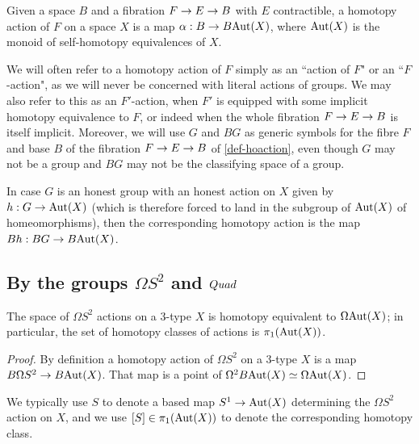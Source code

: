 \documentclass{amsart}
\begin{document}
\begin{definition} 
\label{def-hoaction}
Given a space $B$ and a fibration $F \rightarrow E \rightarrow B$ with $E$ contractible, a homotopy action of $F$ on a space $X$ is a map $\alpha: B \rightarrow B\mathrm{Aut}(X)$, where $\mathrm{Aut}(X)$ is the monoid of self-homotopy equivalences of $X$.
\end{definition}
\nid We will often refer to a homotopy action of $F$ simply as an ``action of $F$" or an ``$F$-action", as we will never be concerned with literal actions of groups.  We may also refer to this as an $F'$-action, when $F'$ is equipped with some implicit homotopy equivalence to $F$, or indeed when the whole fibration $F \rightarrow E \rightarrow B$ is itself implicit.  Moreover, we will use $G$ and $BG$ as generic symbols for the fibre $F$ and base $B$ of the fibration $F \rightarrow E \rightarrow B$ of \cref{def-hoaction}, even though $G$ may not be a group and $BG$ may not be the classifying space of a group.

In case $G$ is an honest group with an honest action on $X$ given by $h: G \rightarrow \mathrm{Aut}(X)$ (which is therefore forced to land in the subgroup of $\mathrm{Aut}(X)$ of homeomorphisms), then the corresponding homotopy action is the map $Bh: BG \rightarrow B\mathrm{Aut}(X)$.


\subsection{By the groups $\Omega S^2$ and $Quad$} \label{sec-quadaction}

\begin{proposition}
The space of $\Omega S^2$ actions on a 3-type $X$ is homotopy equivalent to $\Omega \mathrm{Aut}(X)$; in particular, the set of homotopy classes of actions is $\pi_1(\mathrm{Aut}(X))$.
\end{proposition}

\begin{proof}
By definition a homotopy action of $\Omega S^2$ on a 3-type $X$ is a map $B \Omega S^2 \rightarrow B\mathrm{Aut}(X)$.  That map is a point of $\Omega^2 B\mathrm{Aut}(X) \simeq \Omega \mathrm{Aut}(X)$.
\end{proof}

\nid We typically use $S$ to denote a based map $S^1 \rightarrow \mathrm{Aut}(X)$ determining the $\Omega S^2$ action on $X$, and we use $[S] \in \pi_1(\mathrm{Aut}(X))$ to denote the corresponding homotopy class.

\end{document}
